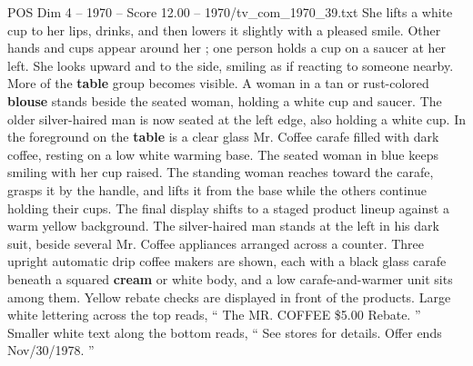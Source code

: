 \begin{textsample}{POS Dim 4 – 1970 – Score 12.00 – 1970/tv\_com\_1970\_39.txt}
She lifts a white cup to her lips, drinks, and then lowers it slightly with a pleased smile.
Other hands and cups appear around her ; one person holds a cup on a saucer at her left.
She looks upward and to the side, smiling as if reacting to someone nearby.
More of the \textbf{table} group becomes visible.
A woman in a tan or rust-colored \textbf{blouse} stands beside the seated woman, holding a white cup and saucer.
The older silver-haired man is now seated at the left edge, also holding a white cup.
In the foreground on the \textbf{table} is a clear glass Mr.
Coffee carafe filled with dark coffee, resting on a low white warming base.
The seated woman in blue keeps smiling with her cup raised.
The standing woman reaches toward the carafe, grasps it by the handle, and lifts it from the base while the others continue holding their cups.
The final display shifts to a staged product lineup against a warm yellow background.
The silver-haired man stands at the left in his dark suit, beside several Mr.
Coffee appliances arranged across a counter.
Three upright automatic drip coffee makers are shown, each with a black glass carafe beneath a squared \textbf{cream} or white body, and a low carafe-and-warmer unit sits among them.
Yellow rebate checks are displayed in front of the products.
Large white lettering across the top reads, “ The MR.
COFFEE \$5.00 Rebate. ” Smaller white text along the bottom reads, “ See stores for details.
Offer ends Nov/30/1978. ”

\end{textsample}
